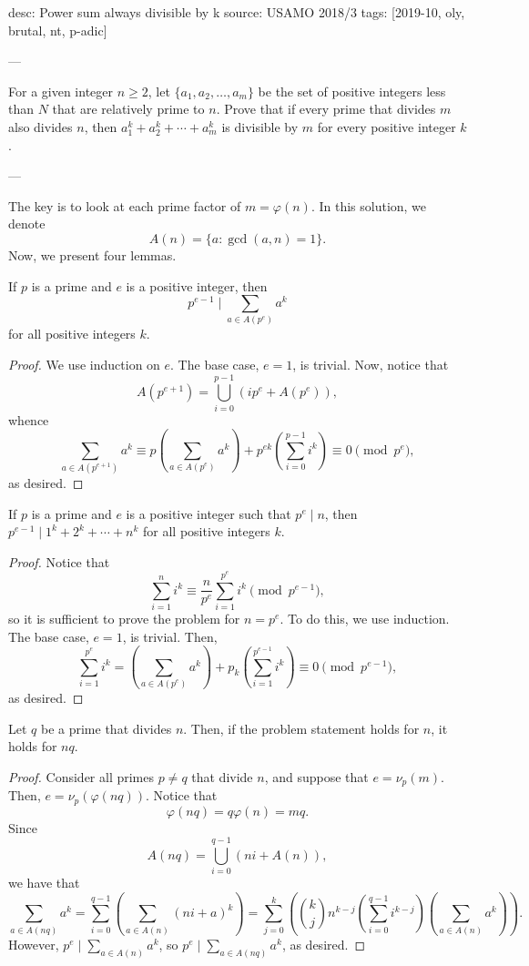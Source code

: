 desc: Power sum always divisible by k
source: USAMO 2018/3
tags: [2019-10, oly, brutal, nt, p-adic]

---

For a given integer $n\ge 2$, let $\{a_1,a_2,\ldots,a_m\}$ be the set of positive integers less than $N$ that are relatively prime to $n$. Prove that if every prime that divides $m$ also divides $n$, then $a_1^k+a_2^k+\cdots+a_m^k$ is divisible by $m$ for every positive integer $k$.

---

The key is to look at each prime factor of $m=\varphi(n)$. In this solution, we denote \[A(n)=\{a:\gcd(a,n)=1\}.\]
Now, we present four lemmas.
\begin{boxlemma}
    If $p$ is a prime and $e$ is a positive integer, then \[p^{e-1}\mid\sum_{a\in A(p^e)}a^k\]
    for all positive integers $k$.
\end{boxlemma}
\begin{proof}
    We use induction on $e$. The base case, $e=1$, is trivial. Now, notice that \[A\left(p^{e+1}\right)=\bigcup_{i=0}^{p-1}(ip^e+A\left(p^e\right)),\]
    whence \[\sum_{a\in A\left(p^{e+1}\right)}a^k\equiv p\left(\sum_{a\in A(p^e)}a^k\right)+p^{ek}\left(\sum_{i=0}^{p-1}i^k\right)\equiv 0\pmod{p^e},\]
    as desired.
\end{proof}
\begin{boxlemma}
    If $p$ is a prime and $e$ is a positive integer such that $p^e\mid n$, then $p^{e-1}\mid 1^k+2^k+\cdots+n^k$ for all positive integers $k$.
\end{boxlemma}
\begin{proof}
    Notice that \[\sum_{i=1}^n i^k\equiv\frac{n}{p^e}\sum_{i=1}^{p^e} i^k\pmod{p^{e-1}},\]
    so it is sufficient to prove the problem for $n=p^e$. To do this, we use induction. The base case, $e=1$, is trivial. Then, \[\sum_{i=1}^{p^e}i^k=\left(\sum_{a\in A(p^e)}a^k\right)+p_k\left(\sum_{i=1}^{p^{e-1}}i^k\right)\equiv 0\pmod{p^{e-1}},\]
    as desired.
\end{proof}
\begin{boxlemma}
    Let $q$ be a prime that divides $n$. Then, if the problem statement holds for $n$, it holds for $nq$.
\end{boxlemma}
\begin{proof}
    Consider all primes $p\ne q$ that divide $n$, and suppose that $e=\nu_p(m)$. Then, $e=\nu_p(\varphi(nq))$. Notice that \[\varphi(nq)=q\varphi(n)=mq.\]
    Since \[A(nq)=\bigcup_{i=0}^{q-1}(ni+A(n)),\]
    we have that \[\sum_{a\in A(nq)}a^k=\sum_{i=0}^{q-1}\left(\sum_{a\in A(n)}(ni+a)^k\right)=\sum_{j=0}^k\left(\binom kj n^{k-j}\left(\sum_{i=0}^{q-1}i^{k-j}\right)\left(\sum_{a\in A(n)}a^k\right)\right).\]
    However, $p^e\mid\sum_{a\in A(n)}a^k$, so $p^e\mid\sum_{a\in A(nq)}a^k$, as desired.
\end{proof}
